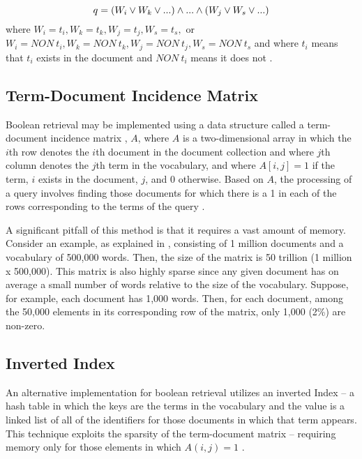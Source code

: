 \begin{equation}
q = (W_i \lor W_k \lor ...) \land ... \land (W_j \lor W_s \lor ...) \\
\end{equation}
where $W_i = t_i, W_k = t_k, W_j = t_j, W_s = t_s,$ or $W_i = NON\ t_i, W_k = NON\ t_k, W_j = NON\ t_j, W_s = NON\ t_s$ and where $t_i$ means that $t_i$ exists in the document and $NON\ t_i$ means it does not .

%
%

\subsection{Term-Document Incidence Matrix}

Boolean retrieval may be  implemented using a data structure called a term-document incidence matrix \cite{manning_2008_introduction_ch1}, $A$,  where $A$ is a two-dimensional array in which the $i$th row denotes the $i$th document in the document collection and where $j$th column denotes the $j$th term in the vocabulary, and where $A[i,j] = 1$ if the term, $i$ exists in the document, $j$, and 0 otherwise.  Based on $A$, the processing of a query involves finding those documents for which there is a 1 in each of the rows corresponding to the terms of the query \cite{manning_2008_introduction_ch1}.  

A significant pitfall of this method is that it requires a vast amount of memory.  Consider an example, as explained in \cite{manning_2008_introduction_ch1}, consisting of 1 million documents and a vocabulary of 500,000 words.  Then, the size of the matrix is 50 trillion (1 million x 500,000).  This matrix is also highly sparse since any given document has on average a small number of words relative to the size of the vocabulary.  Suppose, for example, each document has 1,000 words.  Then, for each document, among the 50,000 elements in its corresponding row of the matrix, only 1,000 (2\%) are non-zero.	

\subsection{Inverted Index}

An alternative implementation for boolean retrieval utilizes an inverted Index \cite{manning_2008_introduction_ch1} -- a hash table in which the keys are the terms in the vocabulary and the value is a linked list of all of the identifiers for those documents in which that term appears.  This technique exploits the sparsity of the term-document matrix -- requiring memory only for those elements in which $A(i,j) = 1$ \cite{manning_2008_introduction_ch1}.


